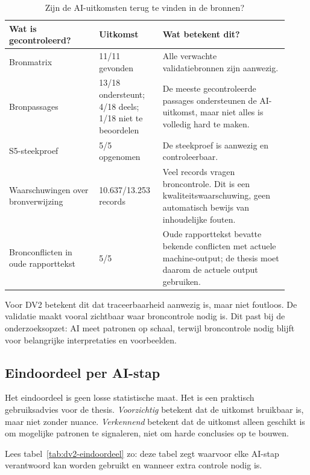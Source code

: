 \begin{table}[htbp]
\centering
\small
\caption{Zijn de AI-uitkomsten terug te vinden in de bronnen?}
\label{tab:dv2-traceerbaarheid}
\begin{tabular}{p{0.30\linewidth}p{0.20\linewidth}p{0.42\linewidth}}
\hline
Wat is gecontroleerd? & Uitkomst & Wat betekent dit? \\
\hline
Bronmatrix & 11/11 gevonden & Alle verwachte validatiebronnen zijn aanwezig. \\
Bronpassages & 13/18 ondersteunt; 4/18 deels; 1/18 niet te beoordelen & De meeste gecontroleerde passages ondersteunen de AI-uitkomst, maar niet alles is volledig hard te maken. \\
S5-steekproef & 5/5 opgenomen & De steekproef is aanwezig en controleerbaar. \\
Waarschuwingen over bronverwijzing & 10.637/13.253 records & Veel records vragen broncontrole. Dit is een kwaliteitswaarschuwing, geen automatisch bewijs van inhoudelijke fouten. \\
Bronconflicten in oude rapporttekst & 5/5 & Oude rapporttekst bevatte bekende conflicten met actuele machine-output; de thesis moet daarom de actuele output gebruiken. \\
\hline
\end{tabular}
\end{table}

Voor DV2 betekent dit dat traceerbaarheid aanwezig is, maar niet foutloos. De validatie maakt vooral zichtbaar waar broncontrole nodig is. Dit past bij de onderzoeksopzet: AI meet patronen op schaal, terwijl broncontrole nodig blijft voor belangrijke interpretaties en voorbeelden.

\subsection{Eindoordeel per AI-stap}
\label{subsec:dv2-eindoordeel}

Het eindoordeel is geen losse statistische maat. Het is een praktisch gebruiksadvies voor de thesis. \emph{Voorzichtig} betekent dat de uitkomst bruikbaar is, maar niet zonder nuance. \emph{Verkennend} betekent dat de uitkomst alleen geschikt is om mogelijke patronen te signaleren, niet om harde conclusies op te bouwen.

Lees tabel~\ref{tab:dv2-eindoordeel} zo: deze tabel zegt waarvoor elke AI-stap verantwoord kan worden gebruikt en wanneer extra controle nodig is.

